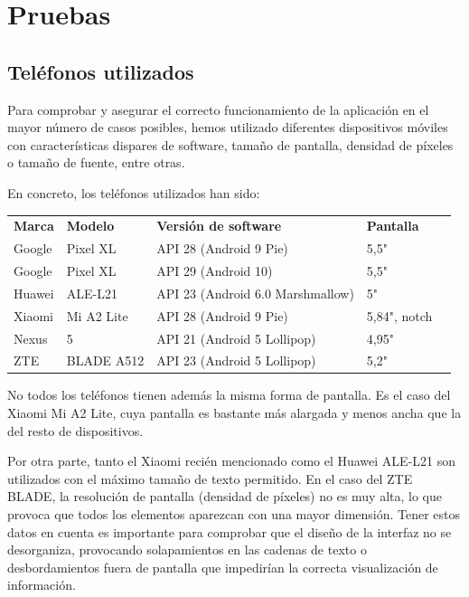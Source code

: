\chapter{Pruebas}

\section{Teléfonos utilizados}

Para comprobar y asegurar el correcto funcionamiento de la aplicación en el mayor número de casos posibles, hemos utilizado diferentes dispositivos móviles con características dispares de software, tamaño de pantalla, densidad de píxeles o tamaño de fuente, entre otras.

En concreto, los teléfonos utilizados han sido:

\begin{table}[H]
\centering
\begin{tabular}{|l|l|l|l|l}
\cline{1-4}
\textbf{Marca} & \textbf{Modelo} & \textbf{Versión de software} & \textbf{Pantalla} & \\ \cline{1-4}
    Google & Pixel XL & API 28 (Android 9 Pie) & 5,5" &  \\ \cline{1-4}
    Google & Pixel XL & API 29 (Android 10) & 5,5" &  \\ \cline{1-4}
    Huawei & ALE-L21 & API 23 (Android 6.0 Marshmallow) & 5" &  \\ \cline{1-4}
    Xiaomi & Mi A2 Lite & API 28 (Android 9 Pie) & 5,84", notch &  \\ \cline{1-4}
    Nexus  & 5 & API 21 (Android 5 Lollipop) & 4,95" &  \\ \cline{1-4}
    ZTE  & BLADE A512 & API 23 (Android 5 Lollipop) & 5,2" &  \\ \cline{1-4}
\end{tabular}
\end{table}

No todos los teléfonos tienen además la misma forma de pantalla. Es el caso del Xiaomi Mi A2 Lite, cuya pantalla es bastante más alargada y menos ancha que la del resto de dispositivos. 

Por otra parte, tanto el Xiaomi recién mencionado como el Huawei ALE-L21 son utilizados con el máximo tamaño de texto permitido. En el caso del ZTE BLADE, la resolución de pantalla (densidad de píxeles) no es muy alta, lo que provoca que todos los elementos aparezcan con una mayor dimensión. Tener estos datos en cuenta es importante para comprobar que el diseño de la interfaz no se desorganiza, provocando solapamientos en las cadenas de texto o desbordamientos fuera de pantalla que impedirían la correcta visualización de información. 

